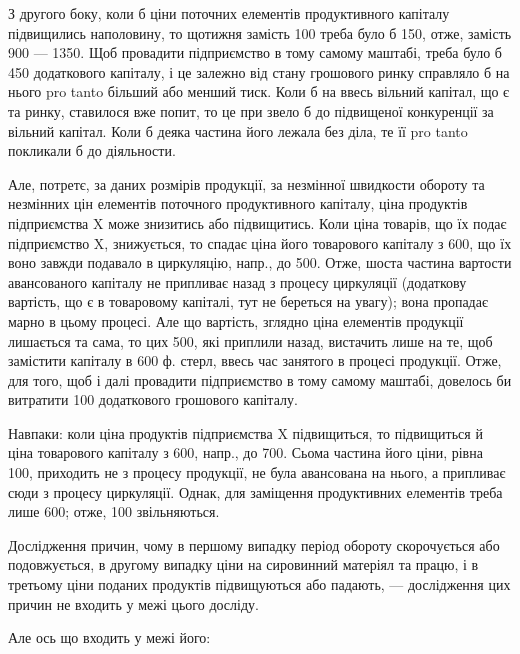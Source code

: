 З другого боку, коли б ціни поточних елементів продуктивного капіталу
підвищились наполовину, то щотижня замість 100 треба
було б 150, отже, замість 900 — 1350. Щоб
провадити підприємство в тому самому маштабі, треба було б 450 додаткового капіталу, і це залежно від стану грошового ринку
справляло б на нього pro tanto більший або менший тиск. Коли б на
ввесь вільний капітал, що є та ринку, ставилося вже попит, то це при
звело б до підвищеної конкуренції за вільний капітал. Коли б деяка частина
його лежала без діла, те її pro tanto покликали б до діяльности.

Але, потретє, за даних розмірів продукції, за незмінної швидкости
обороту та незмінних цін елементів поточного продуктивного капіталу,
ціна продуктів підприємства X може знизитись або підвищитись. Коли
ціна товарів, що їх подає підприємство X, знижується, то спадає ціна
його товарового капіталу з 600, що їх воно завжди подавало
в циркуляцію, напр., до 500. Отже, шоста частина вартости авансованого
капіталу не припливає назад з процесу циркуляції (додаткову вартість,
що є в товаровому капіталі, тут не береться на увагу); вона пропадає
марно в цьому процесі. Але що вартість, зглядно ціна елементів продукції
лишається та сама, то цих 500, які приплили назад, вистачить
лише на те, щоб замістити  капіталу в 600 ф. стерл, ввесь час
занятого в процесі продукції. Отже, для того, щоб і далі провадити підприємство
в тому самому маштабі, довелось би витратити 100
додаткового грошового капіталу.

Навпаки: коли ціна продуктів підприємства X підвищиться, то підвищиться
й ціна товарового капіталу з 600, напр., до 700. Сьома частина його ціни, рівна 100, приходить не з
процесу продукції, не була авансована на нього, а припливає сюди з
процесу циркуляції. Однак, для заміщення продуктивних елементів треба
лише 600; отже, 100 звільняються.

Дослідження причин, чому в першому випадку період обороту
скорочується або подовжується, в другому випадку ціни на сировинний
матеріял та працю, і в третьому ціни поданих продуктів підвищуються
або падають, — дослідження цих причин не входить у межі цього досліду.

Але ось що входить у межі його:

